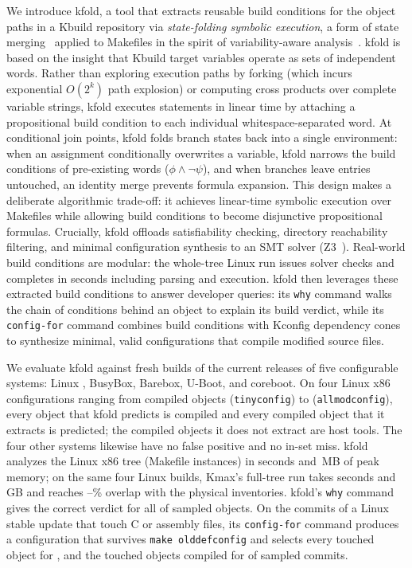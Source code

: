 \documentclass[acmsmall]{acmart}
\newcommand{\tool}{\textsf{kfold}\xspace}
\newcommand{\kmax}{\textsf{Kmax}\xspace}
\begin{document}
We introduce \tool, a tool that extracts reusable build conditions for the object paths in a Kbuild repository via \emph{state-folding symbolic execution}, a form of state merging~\cite{kuznetsov2012efficient,torlak2014symbolic} applied to Makefiles in the spirit of variability-aware analysis~\cite{liebig2011variability,thum2014potential}.
\tool is based on the insight that Kbuild target variables operate as sets of independent words.
Rather than exploring execution paths by forking (which incurs exponential $O(2^k)$ path explosion) or computing cross products over complete variable strings, \tool executes statements in linear time by attaching a propositional build condition to each individual whitespace-separated word.
At conditional join points, \tool folds branch states back into a single environment: when an assignment conditionally overwrites a variable, \tool narrows the build conditions of pre-existing words ($\phi \land \neg \psi$), and when branches leave entries untouched, an identity merge prevents formula expansion.
This design makes a deliberate algorithmic trade-off: it achieves linear-time symbolic execution over Makefiles while allowing build conditions to become disjunctive propositional formulas.
Crucially, \tool offloads satisfiability checking, directory reachability filtering, and minimal configuration synthesis to an SMT solver (\textsc{Z3}~\cite{de2008z3}).
Real-world build conditions are modular: the whole-tree Linux run issues \NLinuxZTchecks solver checks and completes in \NLinuxSeconds seconds including parsing and execution.
\tool then leverages these extracted build conditions to answer developer queries: its \texttt{why} command walks the chain of conditions behind an object to explain its build verdict, while its \texttt{config-for} command combines build conditions with Kconfig dependency cones to synthesize minimal, valid configurations that compile modified source files.

We evaluate \tool against fresh builds of the current releases of five configurable systems: Linux \NLinuxVersion, BusyBox, Barebox, U-Boot, and coreboot.
On four Linux x86 configurations ranging from \NLinuxTinyconfigPhysical compiled objects (\texttt{tinyconfig}) to \NLinuxAllmodconfigPhysical (\texttt{allmodconfig}), every object that \tool predicts is compiled and every compiled object that it extracts is predicted; the compiled objects it does not extract are host tools.
The four other systems likewise have no false positive and no in-set miss.
\tool analyzes the Linux x86 tree (\NLinuxInstances Makefile instances) in \NLinuxSeconds seconds and \NLinuxRss\,MB of peak memory; on the same four Linux builds, \kmax's full-tree run takes \NLinuxKmaxSeconds seconds and \NLinuxKmaxRssGb\,GB and reaches \NLinuxKmaxDebianWithDirsOverlap--\NLinuxKmaxDefconfigWithDirsOverlap\% overlap with the physical inventories.
\tool's \texttt{why} command gives the correct verdict for all \NWhyCorrect of \NWhyCases sampled objects.
On the \NConfigforCommits commits of a Linux stable update that touch C or assembly files, its \texttt{config-for} command produces a configuration that survives \texttt{make olddefconfig} and selects every touched object for \NConfigforSelectable, and the touched objects compiled for \NCompileOk of \NCompileSampled sampled commits.
\end{document}
